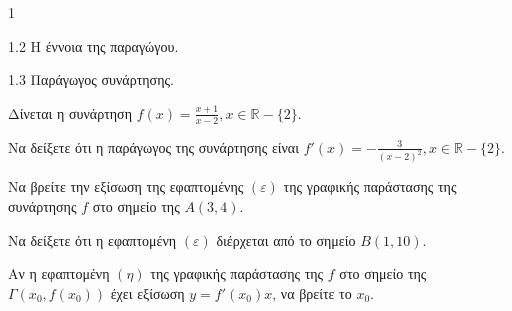 \begin{ylh}{1}
    \item 1.2 Η έννοια της παραγώγου.
    \item 1.3 Παράγωγος συνάρτησης.
\end{ylh}
Δίνεται η συνάρτηση $f(x) = \frac{x+1}{x-2}, x \in \mathbb{R}-\{2\}$.

\begin{alist}
    \item Να δείξετε ότι η παράγωγος της συνάρτησης είναι $f'(x) = -\frac{3}{(x-2)^2}, x \in \mathbb{R}-\{2\}$. 
    
    \item 
    \begin{rlist}
        \item Να βρείτε την εξίσωση της εφαπτομένης $(\varepsilon)$ της γραφικής παράστασης της συνάρτησης $f$ στο σημείο της $A(3,4)$. 
        
        \item Να δείξετε ότι η εφαπτομένη $(\varepsilon)$ διέρχεται από το σημείο $B(1,10)$. 
    \end{rlist}
    
    \item Αν η εφαπτομένη $(\eta)$ της γραφικής παράστασης της $f$ στο σημείο της $\Gamma(x_0, f(x_0))$ έχει εξίσωση $y = f'(x_0)x$, να βρείτε το $x_0$. 
\end{alist}


